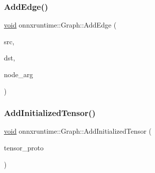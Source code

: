 \mbox{\label{classonnxruntime_1_1Graph_a1f29d2bd901e3bb473c964ff711aa724}} 
\subsubsection{\texorpdfstring{Add\+Edge()}{AddEdge()}}
{\footnotesize\ttfamily \mbox{\hyperlink{mlasi_8h_a88f941d423cb2a819b70a1358982b1a6}{void}} onnxruntime\+::\+Graph\+::\+Add\+Edge (\begin{DoxyParamCaption}\item[{\mbox{\hyperlink{classonnxruntime_1_1Node}{Node}} \&}]{src,  }\item[{\mbox{\hyperlink{classonnxruntime_1_1Node}{Node}} \&}]{dst,  }\item[{const \mbox{\hyperlink{classonnxruntime_1_1NodeArg}{Node\+Arg}} \&}]{node\+\_\+arg }\end{DoxyParamCaption})}

\mbox{\label{classonnxruntime_1_1Graph_a5699ed675666c1b351bd35490d94be6d}} 
\subsubsection{\texorpdfstring{Add\+Initialized\+Tensor()}{AddInitializedTensor()}}
{\footnotesize\ttfamily \mbox{\hyperlink{mlasi_8h_a88f941d423cb2a819b70a1358982b1a6}{void}} onnxruntime\+::\+Graph\+::\+Add\+Initialized\+Tensor (\begin{DoxyParamCaption}\item[{const O\+N\+N\+X\+\_\+\+N\+A\+M\+E\+S\+P\+A\+C\+E\+::\+Tensor\+Proto \&}]{tensor\+\_\+proto }\end{DoxyParamCaption})}

\mbox{\label{classonnxruntime_1_1Graph_aac8515a9a51b8fc25bff257c4e1c0bb6}} 
